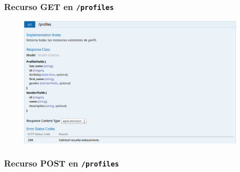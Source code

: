 \newpage


\subsubsection{Recurso GET en \texttt{/profiles}}

\begin{figure}[h]
  \centering
  \includegraphics[width=\textwidth,height=.75\textheight,keepaspectratio]{img/especificacion_api/profileList_get}
  \label{profileList_get}
\end{figure}

\newpage


\subsubsection{Recurso POST en \texttt{/profiles}}

